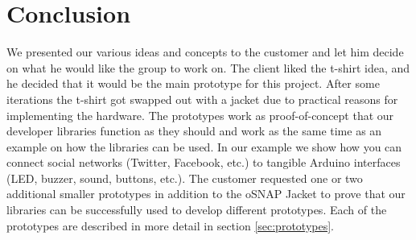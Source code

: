 \newpage

\section{Conclusion}
We presented our various ideas and concepts to the customer and let him decide on what he would
like the group to work on. The client liked the t-shirt idea, and he decided that it would be the main prototype for this project. 
After some iterations the t-shirt got swapped out with a jacket due to practical reasons for implementing the hardware. 
The prototypes work as proof-of-concept that our developer libraries function as they should and work as the same time as an 
example on how the libraries can be used. In our example we show how you can connect social networks (Twitter, Facebook, etc.) to 
tangible Arduino interfaces (LED, buzzer, sound, buttons, etc.). The customer requested one or two additional smaller prototypes in 
addition to the oSNAP Jacket to prove that our libraries can be successfully used to develop different prototypes. Each of the prototypes are 
described in more detail in section \ref{sec:prototypes}.
